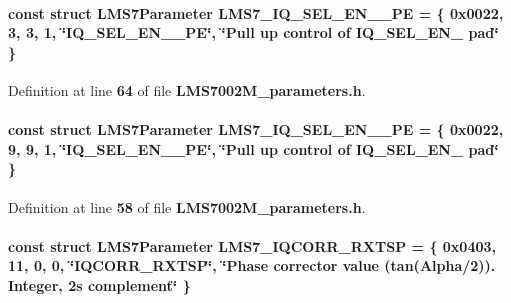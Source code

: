 \paragraph[{L\+M\+S7\+\_\+\+I\+Q\+\_\+\+S\+E\+L\+\_\+\+E\+N\+\_\+1\+\_\+\+PE}]{\setlength{\rightskip}{0pt plus 5cm}const struct {\bf L\+M\+S7\+Parameter} L\+M\+S7\+\_\+\+I\+Q\+\_\+\+S\+E\+L\+\_\+\+E\+N\+\_\+\_\+\+PE = \{ 0x0022, 3, 3, 1, \char`\"{}\+I\+Q\+\_\+\+S\+E\+L\+\_\+\+E\+N\+\_\+\_\+\+P\+E\char`\"{}, \char`\"{}\+Pull up control of I\+Q\+\_\+\+S\+E\+L\+\_\+\+E\+N\+\_ pad\char`\"{} \}\hspace{0.3cm}{\ttfamily [static]}}\label{LMS7002M__parameters_8h_adb5554ca4718fdd25bae4ab6979804da}


Definition at line {\bf 64} of file {\bf L\+M\+S7002\+M\+\_\+parameters.\+h}.

\paragraph[{L\+M\+S7\+\_\+\+I\+Q\+\_\+\+S\+E\+L\+\_\+\+E\+N\+\_\+2\+\_\+\+PE}]{\setlength{\rightskip}{0pt plus 5cm}const struct {\bf L\+M\+S7\+Parameter} L\+M\+S7\+\_\+\+I\+Q\+\_\+\+S\+E\+L\+\_\+\+E\+N\+\_\+\_\+\+PE = \{ 0x0022, 9, 9, 1, \char`\"{}\+I\+Q\+\_\+\+S\+E\+L\+\_\+\+E\+N\+\_\+\_\+\+P\+E\char`\"{}, \char`\"{}\+Pull up control of I\+Q\+\_\+\+S\+E\+L\+\_\+\+E\+N\+\_ pad\char`\"{} \}\hspace{0.3cm}{\ttfamily [static]}}\label{LMS7002M__parameters_8h_ad8f54e7c914045c08144a5e802df6762}


Definition at line {\bf 58} of file {\bf L\+M\+S7002\+M\+\_\+parameters.\+h}.

\paragraph[{L\+M\+S7\+\_\+\+I\+Q\+C\+O\+R\+R\+\_\+\+R\+X\+T\+SP}]{\setlength{\rightskip}{0pt plus 5cm}const struct {\bf L\+M\+S7\+Parameter} L\+M\+S7\+\_\+\+I\+Q\+C\+O\+R\+R\+\_\+\+R\+X\+T\+SP = \{ 0x0403, 11, 0, 0, \char`\"{}\+I\+Q\+C\+O\+R\+R\+\_\+\+R\+X\+T\+S\+P\char`\"{}, \char`\"{}\+Phase corrector value (tan(\+Alpha/2)). Integer, 2\textquotesingle{}s complement\char`\"{} \}\hspace{0.3cm}{\ttfamily [static]}}\label{LMS7002M__parameters_8h_a04a3a44cd214b6b1e5b259afffb6bd90}



